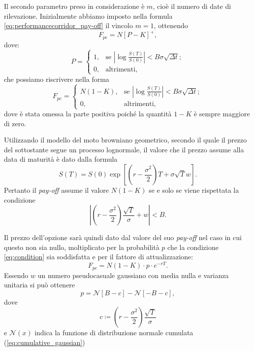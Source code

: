 Il secondo parametro preso in considerazione è $m$, cioè il numero di date di rilevazione. Inizialmente abbiamo imposto nella formula \eqref{eq:performancecorridor_pay-off} il vincolo $m=1$, ottenendo
\begin{equation}
    F_{pc}=N[P-K]^{+},
\end{equation}
dove:
\begin{equation}
    P = \begin{cases}
    1, & \text{se} \,\,\left| \log{\frac{S(T)}{S(0)}} \right| < B \sigma \sqrt{\Delta t};\\
    0, & \text{altrimenti},
    \label{eq:pc_condition}
  \end{cases}
\end{equation}
che possiamo riscrivere nella forma
\begin{equation}
    F_{pc} = \begin{cases}
    N(1-K), & \text{se} \,\,\left| \log{\frac{S(T)}{S(0)}} \right| < B\sigma \sqrt{\Delta t};\\
    0, & \text{altrimenti},
  \end{cases}
\end{equation}
dove è stata omessa la parte positiva poiché la quantità $1-K$ è sempre maggiore di zero.

Utilizzando il modello del moto browniano geometrico, secondo il quale il prezzo del sottostante segue un processo lognormale, il valore che il prezzo assume alla data di maturità è dato dalla formula
\begin{equation}
    S(T) = S(0) \exp{\left[\left(r- \frac{\sigma^2}{2}\right)T + \sigma \sqrt{T} w\right]}.
\end{equation}
Pertanto il \textit{pay-off} assume il valore $N(1-K)$ se e solo se viene rispettata la condizione
\begin{equation}
    \left| \left(r- \frac{\sigma^2}{2}\right) \frac{\sqrt{T}}{\sigma} + w \right| < B.
    \label{eq:condition}
\end{equation}

Il prezzo dell'opzione sarà quindi dato dal valore del suo \textit{pay-off} nel caso in cui questo non sia nullo, moltiplicato per la probabilità $p$ che la condizione \eqref{eq:condition} sia soddisfatta e per il fattore di attualizzazione:
\begin{equation}
    F_{pc}=N(1-K) \cdot p \cdot e^{-rT}.
\end{equation}
Essendo $w$ un numero pseudocasuale gaussiano con media nulla e varianza unitaria si può ottenere
\begin{equation}
    p = \mathcal{N}[B-c] - \mathcal{N}[-B-c],
\end{equation}
dove
\begin{equation}
    c \coloneqq \left(r- \frac{\sigma^2}{2}\right) \frac{\sqrt{T}}{\sigma}
\end{equation}
e $\mathcal{N}(x)$ indica la funzione di distribuzione normale cumulata (\ref{eq:cumulative_gaussian})

